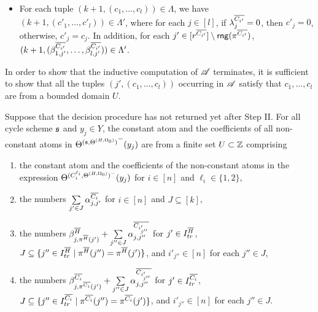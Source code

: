 \begin{enumerate}
\begin{itemize}
\begin{itemize}
\item For each tuple $(k+1, (c_1, \dots, c_l)) \in \Lambda$, we have $(k+1, (c'_1, \dots, c'_l)) \in \Lambda'$, where for each $j \in [l]$, if $\lambda^{\overline{C_{i'}}}_j = 0$, then $c'_{j}= 0$, otherwise, $c'_{j} = c_j$. In addition, for each $j' \in [r^{\overline{C_{i'}}}] \setminus \mathsf{rng}(\pi^{\overline{C_{i'}}})$, $(k+1, (\beta^{\overline{C_{i'}}}_{1, j'}, \dots, \beta^{\overline{C_{i'}}}_{l, j'})) \in \Lambda'$. 
\end{itemize}
\end{itemize}
\end{enumerate}


In order to show that the inductive computation of $\mathscr{A}$ terminates, it is sufficient to show that all the tuples $(j', (c_1, \dots, c_l))$ occurring in $\mathscr{A}$ satisfy that $c_1,\dots, c_l$ are from a bounded domain $U$.

\begin{lemma}\label{prop-bnd-domain-2}
	Suppose that the decision procedure has not returned yet after Step II. 
	For all cycle scheme ${\mathfrak{s} }$ and $y_j \in Y$, the constant atom and the coefficients of all non-constant atoms in ${\Theta^{({\mathfrak{s} }, \Theta^{(H,\Omega_0)})}}^-(y_j)$ are from a finite set $U \subset {\mathbb{Z} }$ comprising
	\begin{enumerate}
	\item the constant atom and the coefficients of the non-constant atoms in the expression $\Theta^{(C^{\ell_i}_{i}, \Theta^{(H, \Omega_0)})^-}(y_j)$ for $i\in [n]$ and $\ell_i \in \{1,2\}$,
	\item the numbers  $\sum \limits_{j' \in J} \alpha^{\overline{C_{i}}}_{j,j'}$ for $i \in [n]$ and $J \subseteq [k]$, 
	\item the numbers $\beta^{\overline{H}}_{j,\pi^{\overline{H}}(j')} + \sum \limits_{j'' \in J} \alpha^{\overline{C_{i'_{j''}}}}_{j,j''}$ for $j' \in I^{\overline{H}}_{tr}$, $J \subseteq \{j'' \in I^{\overline{H}}_{tr} \mid  \pi^{\overline{H}}(j'') = \pi^{\overline{H}}(j')\}$, and $i'_{j''} \in [n]$ for each $j'' \in J$, 
	\item the numbers $\beta^{\overline{C_i}}_{j,\pi^{\overline{C_i}}(j')} + \sum \limits_{j'' \in J} \alpha^{\overline{C_{i'_{j''}}}}_{j,j''}$ for $j' \in I^{\overline{C_i}}_{tr}$, $J \subseteq \{j'' \in I^{\overline{C_i}}_{tr} \mid  \pi^{\overline{C_i}}(j'') = \pi^{\overline{C_i}}(j')\}$, and $i'_{j''} \in [n]$  for each $j'' \in J$. 
	\end{enumerate}
\end{lemma}


